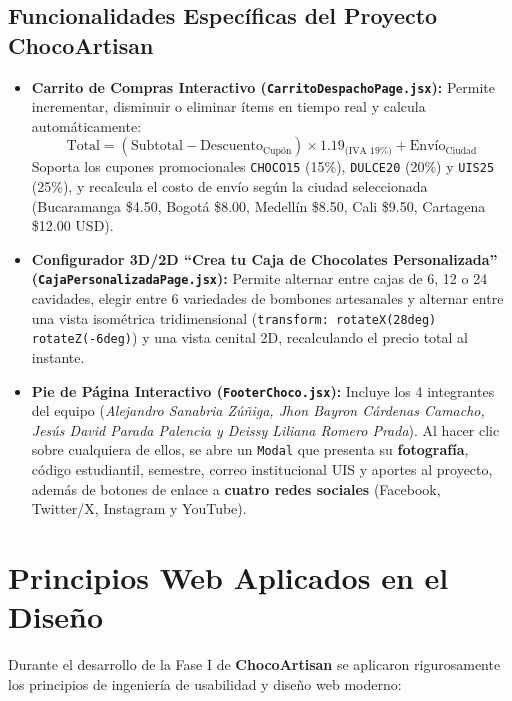 \documentclass[12pt,letterpaper]{article}
\begin{document}
\subsection{Funcionalidades Específicas del Proyecto ChocoArtisan}
\begin{itemize}[leftmargin=1.2cm]
  \item \textbf{Carrito de Compras Interactivo (\texttt{CarritoDespachoPage.jsx}):} Permite incrementar, disminuir o eliminar ítems en tiempo real y calcula automáticamente:
    \[
      \text{Total} = (\text{Subtotal} - \text{Descuento}_{\text{Cup\'on}}) \times 1.19_{\text{(IVA 19\%)}} + \text{Env\'io}_{\text{Ciudad}}
    \]
    Soporta los cupones promocionales \texttt{CHOCO15} (15\%), \texttt{DULCE20} (20\%) y \texttt{UIS25} (25\%), y recalcula el costo de envío según la ciudad seleccionada (Bucaramanga \$4.50, Bogotá \$8.00, Medellín \$8.50, Cali \$9.50, Cartagena \$12.00 USD).
  \item \textbf{Configurador 3D/2D ``Crea tu Caja de Chocolates Personalizada'' (\texttt{CajaPersonalizadaPage.jsx}):} Permite alternar entre cajas de 6, 12 o 24 cavidades, elegir entre 6 variedades de bombones artesanales y alternar entre una vista isométrica tridimensional (\texttt{transform: rotateX(28deg) rotateZ(-6deg)}) y una vista cenital 2D, recalculando el precio total al instante.
  \item \textbf{Pie de Página Interactivo (\texttt{FooterChoco.jsx}):} Incluye los 4 integrantes del equipo (\textit{Alejandro Sanabria Zúñiga, Jhon Bayron Cárdenas Camacho, Jesús David Parada Palencia y Deissy Liliana Romero Prada}). Al hacer clic sobre cualquiera de ellos, se abre un \texttt{Modal} que presenta su \textbf{fotografía}, código estudiantil, semestre, correo institucional UIS y aportes al proyecto, además de botones de enlace a \textbf{cuatro redes sociales} (Facebook, Twitter/X, Instagram y YouTube).
\end{itemize}

\newpage

\section{Principios Web Aplicados en el Diseño}

Durante el desarrollo de la Fase I de \textbf{ChocoArtisan} se aplicaron rigurosamente los principios de ingeniería de usabilidad y diseño web moderno:
\end{document}
